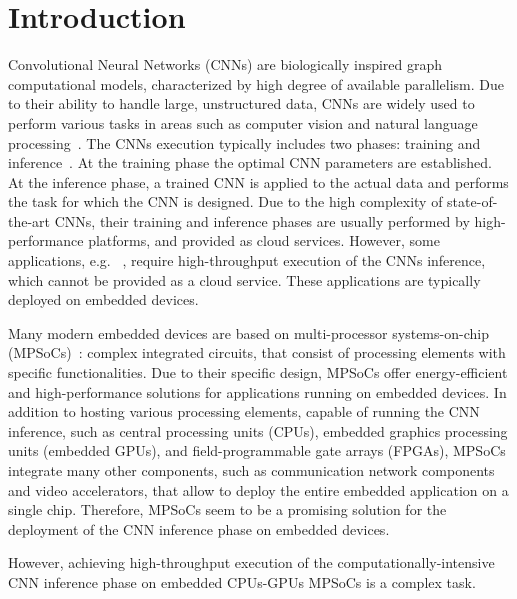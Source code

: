 \section{Introduction}
\label{sec:Intro}

Convolutional Neural Networks (CNNs) are biologically inspired graph computational models, characterized by high degree of available parallelism. Due to their ability to handle large, unstructured data, CNNs are widely used to perform various tasks in areas such as computer vision and natural language processing~\cite{Alom2018}. The CNNs execution typically includes two phases: training and  inference~\cite{Alom2018}. At the training phase the optimal CNN parameters are established. At the inference phase, a trained CNN is applied to the actual data and performs the task for which the CNN is designed. Due to the high complexity of state-of-the-art CNNs, their training and inference phases are usually performed by high-performance platforms, and provided as cloud services. However, some applications, e.g. ~\cite{MLInMedicineSecurity, MLInCars,MLinMedicine}, require high-throughput execution of the CNNs inference, which cannot be provided as a cloud service. These applications are typically deployed on embedded devices.

 
Many modern embedded devices are based on multi-processor systems-on-chip
(MPSoCs)~\cite{Martin:DAC06}: complex integrated circuits, that consist of processing elements with specific functionalities.
Due to their specific design, MPSoCs offer energy-efficient and high-performance
solutions for applications running on embedded devices. In addition
to hosting various processing elements, capable of running the CNN
inference, such as central processing units (CPUs), embedded graphics
processing units (embedded GPUs), and field-programmable gate arrays
(FPGAs), MPSoCs integrate many other components, such as communication network 
components and video accelerators, that allow to deploy the entire embedded application on a single
chip. Therefore, MPSoCs seem to be a promising solution for the deployment
of the CNN inference phase on embedded devices. 

However, achieving high-throughput execution of the computationally-intensive CNN inference phase on embedded CPUs-GPUs MPSoCs is a complex task. 


